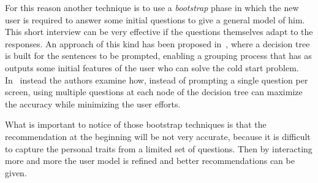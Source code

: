 For this reason another technique is to use a \textit{bootstrap} phase in which the new user is required to answer some initial questions to give a general model of him. This short interview can be very effective if the questions themselves adapt to the responses. An approach of this kind has been proposed in~\cite{lika2014facing}, where a decision tree is built for the sentences to be prompted, enabling a grouping process that has as outputs some initial features of the user who can solve the cold start problem. In~\cite{sun2013learning} instead the authors examine how, instead of prompting a single question per screen, using multiple questions at each node of the decision tree can maximize the accuracy while minimizing the user efforts.

What is important to notice of those bootstrap techniques is that the recommendation at the beginning will be not very accurate, because it is difficult to capture the personal traits from a limited set of questions. Then by interacting more and more the user model is refined and better recommendations can be given.


